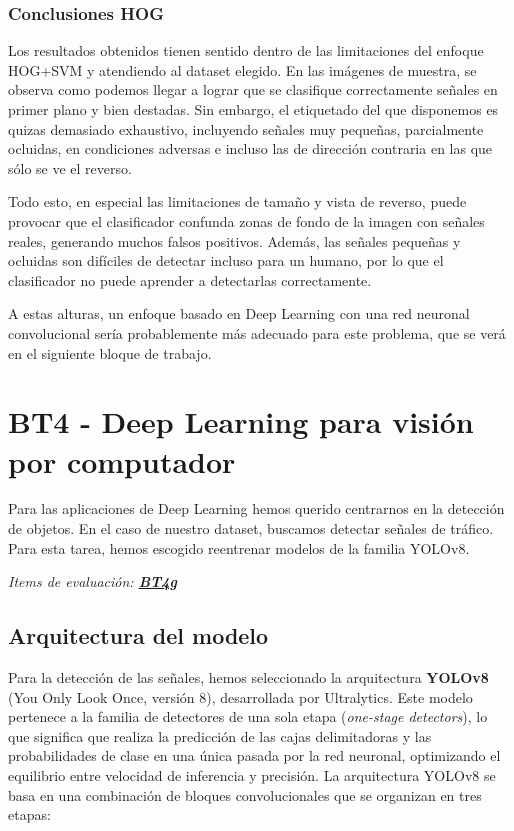 \documentclass[11pt,a4paper]{article}
\begin{document}
\subsubsection{Conclusiones HOG}

Los resultados obtenidos tienen sentido dentro de las limitaciones del enfoque HOG+SVM
y atendiendo al dataset elegido. En las imágenes de muestra, se observa como podemos llegar a lograr
que se clasifique correctamente señales en primer plano y bien destadas. Sin embargo, el etiquetado
del que disponemos es quizas demasiado exhaustivo, incluyendo señales muy pequeñas, parcialmente ocluidas,
en condiciones adversas e incluso las de dirección contraria en las que sólo se ve el reverso.

Todo esto, en especial las limitaciones de tamaño y vista de reverso, puede provocar que el clasificador
confunda zonas de fondo de la imagen con señales reales, generando muchos falsos positivos.
Además, las señales pequeñas y ocluidas son difíciles de detectar incluso para un humano,
por lo que el clasificador no puede aprender a detectarlas correctamente.

A estas alturas, un enfoque basado en Deep Learning con una red neuronal convolucional
sería probablemente más adecuado para este problema, que se verá en el siguiente bloque de trabajo.

\clearpage

\section{BT4 - Deep Learning para visión por computador}

Para las aplicaciones de Deep Learning hemos querido centrarnos en la detección de objetos. En el caso de nuestro dataset,
buscamos detectar señales de tráfico. Para esta tarea, hemos escogido reentrenar modelos de la familia YOLOv8.

\textit{Items de evaluación: \underline{\textbf{BT4g}}}

\subsection{Arquitectura del modelo}

Para la detección de las señales, hemos seleccionado la arquitectura \textbf{YOLOv8} 
(You Only Look Once, versión 8), desarrollada por Ultralytics. 
Este modelo pertenece a la familia de detectores de una sola etapa (\textit{one-stage detectors}), 
lo que significa que realiza la predicción de las cajas delimitadoras y las probabilidades de clase en 
una única pasada por la red neuronal, optimizando el equilibrio entre velocidad de inferencia y precisión.
La arquitectura YOLOv8 se basa en una combinación de bloques convolucionales que se organizan en tres etapas:
\end{document}

